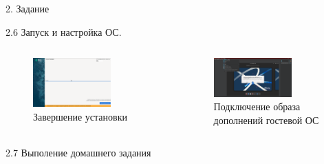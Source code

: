 \documentclass[
  ignorenonframetext,
  aspectratio=169,
]{beamer}
\begin{document}
\begin{frame}{2. Задание}
\begin{block}{2.6 Запуск и настройка ОС.}
\label{ux437ux430ux43fux443ux441ux43a-ux438-ux43dux430ux441ux442ux440ux43eux439ux43aux430-ux43eux441.-3}
\begin{columns}[c]
\begin{figure}

{\centering \includegraphics[width=0.7\textwidth,height=\textheight]{image/13.png}

}

\caption{Завершение установки}

\end{figure}%
\begin{figure}

{\centering \includegraphics[width=0.7\textwidth,height=\textheight]{image/14.png}

}

\caption{Подключение образа дополнений гостевой ОС}

\end{figure}%
\end{columns}
\end{block}

\begin{block}{2.7 Выполение домашнего задания}
\label{ux432ux44bux43fux43eux43bux435ux43dux438ux435-ux434ux43eux43cux430ux448ux43dux435ux433ux43e-ux437ux430ux434ux430ux43dux438ux44f}
\begin{columns}[c]
\begin{figure}


\end{figure}
\end{columns}
\end{block}
\end{frame}
\end{document}
